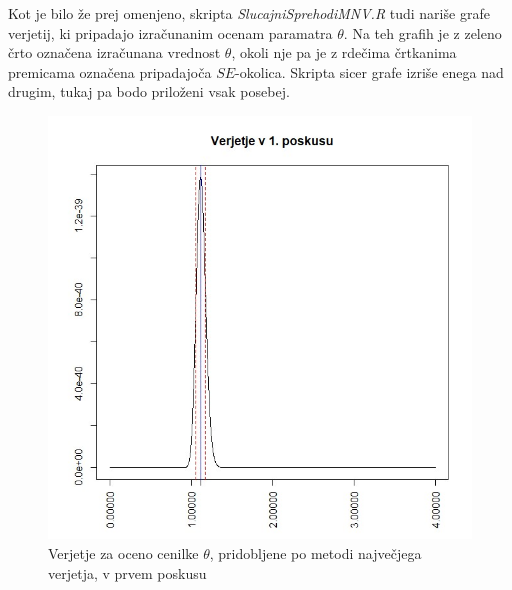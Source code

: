 \documentclass[a4paper, 10pt]{article}
\begin{document}
	Kot je bilo že prej omenjeno, skripta \textit{SlucajniSprehodiMNV.R} tudi nariše grafe verjetij, ki pripadajo izračunanim ocenam paramatra $\theta$. Na teh grafih je z zeleno črto označena izračunana vrednost $\theta$, okoli nje pa je z rdečima črtkanima premicama označena pripadajoča $SE$-okolica. Skripta sicer grafe izriše enega nad drugim, tukaj pa bodo priloženi vsak posebej.
	
	\begin{figure}[h!]
		\label{fig: 2Dplot1}
		\centering
		\includegraphics[scale = 0.3]{VerjetjeMNV1}
		\caption{Verjetje za oceno cenilke $\theta$, pridobljene po metodi največjega verjetja, v prvem poskusu}
	\end{figure}
\end{document}
